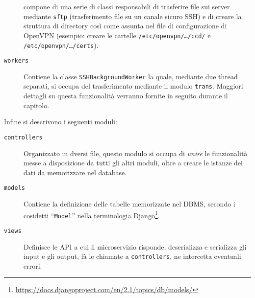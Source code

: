 \begin{description}
  compone di una serie di classi responsabili di trasferire file sui server mediante
  \texttt{sftp} (trasferimento file su un canale sicuro SSH) e di creare
  la struttura di directory così come assunta nel file di configurazione di OpenVPN
  (esempio: creare le cartelle \texttt{/etc/openvpn/\ldots/ccd/} e \texttt{/etc/openvpn/\ldots/certs}).
  \item[\texttt{workers}]Contiene la classe \texttt{SSHBackgroundWorker} la quale, mediante
  due thread separati, si occupa del trasferimento mediante il modulo \texttt{trans}.
  Maggiori dettagli su questa funzionalità verranno fornite in seguito durante
  il capitolo.
\end{description}

Infine si descrivono i seguenti moduli:
\begin{description}
  \item[\texttt{controllers}]Organizzato in dversi file, questo modulo si occupa di
  \textit{unire} le funzionalità messe a disposizione da tutti gli altri moduli,
  oltre a creare le istanze dei dati da memorizzare nel database.
  \item[\texttt{models}]Contiene la definizione delle tabelle memorizzate nel DBMS, secondo
  i cosidetti ``\texttt{Model}'' nella terminologia
  Django\footnote{\url{https://docs.djangoproject.com/en/2.1/topics/db/models/}}.
  \item[\texttt{views}]Definisce le API a cui il microservizio risponde, deserializza e serializza
  gli input e gli output, fà le chiamate a \texttt{controllers}, ne intercetta eventuali errori.
\end{description}